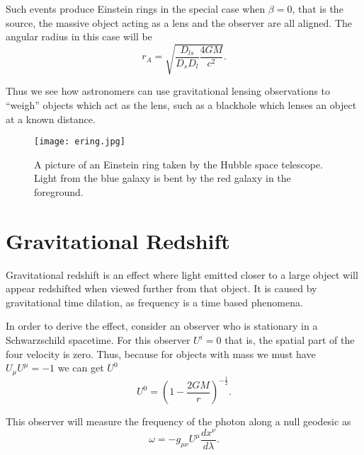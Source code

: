 Such events produce Einstein rings in the special case when \(\beta = 0\), that is the source, the massive object acting as a lens and the observer are all aligned. The angular radius in this case will be
\begin{equation} \label{angular-radius}
	r_{A} = \sqrt{ \frac{D_{ls}}{D_{s} D_{l}} \frac{4 G M}{c^2}} .
\end{equation}

Thus we see how astronomers can use gravitational lensing observations to ``weigh'' objects which act as the lens, such as a blackhole which lenses an object at a known distance.

\begin{figure}[h!]
	\centering
	\texttt{[image: ering.jpg]}
	\caption{A picture of an Einstein ring taken by the Hubble space telescope. Light from the blue galaxy is bent by the red galaxy in the foreground.}
\end{figure}

\section{Gravitational Redshift}

Gravitational redshift is an effect where light emitted closer to a large object will appear redshifted when viewed further from that object. It is caused by gravitational time dilation, as frequency is a time based phenomena.

In order to derive the effect, consider an observer who is stationary in a Schwarzschild spacetime. For this observer \(U^{i} = 0\) that is, the spatial part of the four velocity is zero. Thus, because for objects with mass we must have \(U_{\mu} U^{\mu} = -1\) we can get \(U^{0}\) \cite{carroll}
\begin{equation} \label{time-dilation-schwarzschild}
	U^{0} = \left( 1 - \frac{2 G M}{r}\right)^{- \frac{1}{2}} .
\end{equation}

This observer will measure the frequency of the photon along a null geodesic as
\begin{equation} \label{photon-null-geodesic}
	\omega = - g_{\mu \nu} U^{\mu} \frac{d x^{\nu}}{d \lambda} .
\end{equation}

